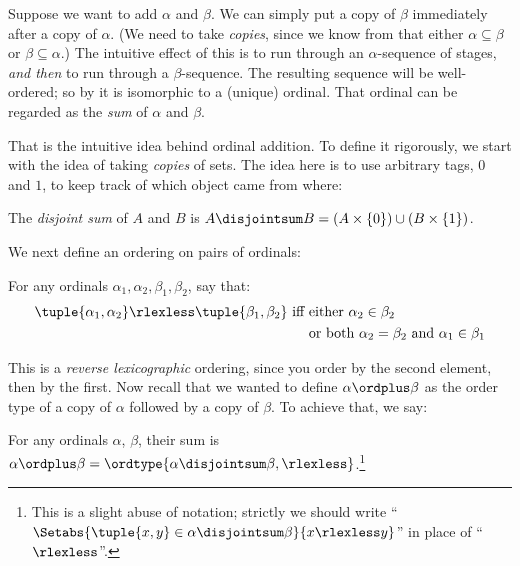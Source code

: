 \documentclass[../../../include/open-logic-section]{subfiles}
\begin{document}

Suppose we want to add $\alpha$ and $\beta$. We can simply put a
{copy} of $\beta$ immediately after a copy of $\alpha$. (We need to
take \emph{copies}, since we know from
 that either $\alpha
\subseteq \beta$ or $\beta \subseteq \alpha$.) The intuitive effect of
this is to run through an $\alpha$-sequence of stages, \emph{and then}
to run through a $\beta$-sequence. The resulting sequence will be
well-ordered; so by
 it is isomorphic
to a (unique) ordinal. That ordinal can be regarded as the \emph{sum}
of $\alpha$ and $\beta$. 

That is the intuitive idea behind ordinal addition. To define it
rigorously, we start with the idea of taking \emph{copies} of sets.
The idea here is to use arbitrary tags, $0$ and $1$, to keep track of
which object came from where:

\begin{defn}
The \emph{disjoint sum} of $A$ and $B$ is $A \disjointsum B = (A\times
\{0\}) \cup (B \times \{1\})$.
\end{defn}

We next define an ordering on pairs of ordinals:

\begin{defn}
For any ordinals $\alpha_1, \alpha_2, \beta_1, \beta_2$, say that:
\begin{align*}
	\tuple{\alpha_1, \alpha_2} \rlexless \tuple{\beta_1, \beta_2}\text{ iff }& 
	\text{either $\alpha_2 \in \beta_2$}\\
	& \text{or both $\alpha_2 = \beta_2$ and $\alpha_1 \in \beta_1$}
\end{align*} 
\end{defn}

This is a \emph{reverse lexicographic} ordering, since you order by
the second element, then by the first. Now recall that we wanted to
define $\alpha \ordplus \beta$ as the order type of a copy of $\alpha$
followed by a copy of $\beta$. To achieve that, we say:

\begin{defn}
For any ordinals $\alpha$, $\beta$, their sum is $\alpha \ordplus
\beta = \ordtype{\alpha \disjointsum \beta, \rlexless}$.\footnote{This
is a slight abuse of notation; strictly we should write
``$\Setabs{\tuple{x,y}\in \alpha\disjointsum\beta}{x \rlexless y}$''
in place of ``$\rlexless$''.}
\end{defn}
\end{document}
